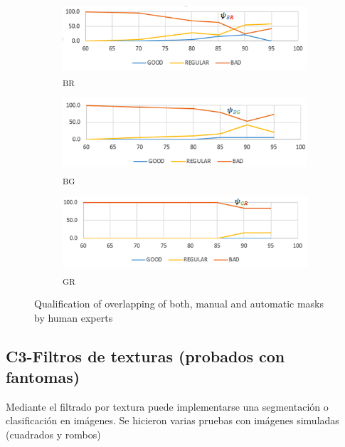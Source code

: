 \begin{figure}
     \centering
     \begin{subfigure}[b]{0.3\textwidth}
         \centering
         \includegraphics[width=\textwidth]{Imagenes/psiBR.png}
         \caption{\textpsi \textsubscript{BR}}
         \label{psiBR}
     \end{subfigure}
     \hfill
     \begin{subfigure}[b]{0.3\textwidth}
         \centering
         \includegraphics[width=\textwidth]{Imagenes/psiBG.png}
         \caption{\textpsi \textsubscript{BG}}
         \label{psiBG}
     \end{subfigure}
     \hfill
     \begin{subfigure}[b]{0.3\textwidth}
         \centering
         \includegraphics[width=\textwidth]{Imagenes/psiGR.png}
         \caption{\textpsi \textsubscript{GR}}
         \label{psiGR}
     \end{subfigure}
        \caption{Qualification of overlapping of both, manual and automatic masks by human experts}
        \label{humanscoring}
\end{figure}

\color{black} 
\subsection{C3-Filtros de texturas (probados con fantomas)}
Mediante el filtrado por textura puede implementarse una segmentación o clasificación en imágenes. Se hicieron varias pruebas con imágenes simuladas (cuadrados y rombos)
